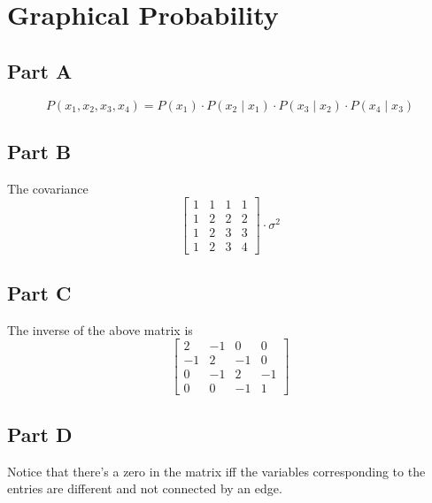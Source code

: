 \documentclass[12pt]{article}
\begin{document}
\section{Graphical Probability}

\subsection{Part A}

\[P(x_1, x_2, x_3, x_4)=
    P(x_1) \cdot P(x_2 \mid x_1) \cdot P(x_3 \mid x_2) \cdot P(x_4 \mid x_3)\]

\subsection{Part B}

The covariance
\[\begin{bmatrix}
        1 & 1 & 1 & 1 \\
        1 & 2 & 2 & 2 \\
        1 & 2 & 3 & 3 \\
        1 & 2 & 3 & 4
    \end{bmatrix} \cdot \sigma^2\]

\subsection{Part C}

The inverse of the above matrix is
\[\begin{bmatrix}
        2  & -1 & 0  & 0  \\
        -1 & 2  & -1 & 0  \\
        0  & -1 & 2  & -1 \\
        0  & 0  & -1 & 1
    \end{bmatrix}\]

\subsection{Part D}

Notice that there's a zero in the matrix iff the variables
corresponding to the entries are different and not connected by an edge.
\end{document}
